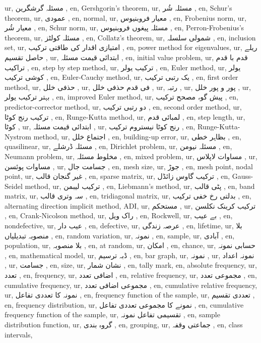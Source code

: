 ur, مسئلہ گرشگرین ,
en, Gershgorin's theorem,
ur, مسئلہ شُر ,
en, Schur's theorem,
ur, عمودی ,
en, normal,
ur, معیار فروبنیوس ,
en, Frobenius norm,
ur, معیار شُر ,
en, Schur norm,
ur, مسئلہ پیغوں فروبنیوس ,
en, Perron-Frobenius's theorem,
ur, مسئلہ کولٹز ,
en, Collatz's theorem,
ur, شمولی سلسلہ ,
en, inclusion set,
ur, امتیازی اقدار کی طاقتی ترکیب ,
en, power method for eigenvalues,
ur, ریلے حاصل تقسیم ,
ur, ابتدائی قیمت مسئلہ ,
en, initial value problem,
ur, قدم با قدم تراکیب ,
en, step by step method,
ur, ترکیب یولر ,
en, Euler method,
ur, یولر کوشی ترکیب ,
en, Euler-Cauchy method,
ur, یک رتبی ترکیب ,
en, first order method,
ur, حذفی خلل ,
ur, فی قدم حذفی خلل ,
ur, رتبہ ,
ur, پور و پور خلل ,
ur, بہتر ترکیب یولر ,
en, improved Euler method,
ur, پیش گو، مصحح ترکیب ,
en, predictor-corrector method,
ur, دو رتبی ترکیب ,
en, second order method,
ur, ترکیب رنج کوٹا ,
en, Runge-Kutta method,
ur, لمبائی قدم ,
en, step length,
ur, کوٹا ,
ur, ابتدائی قیمت مسئلہ ,
ur, رنج کوٹا نیستروم ترکیب ,
en, Runge-Kutta-Nystrom method,
ur, اجتماع خلل ,
en, building-up error,
ur, بظاہر خطی ,
en, quasilinear,
ur, مسئلہ ڈرشلے ,
en, Dirichlet problem,
ur, مسئلہ نیومن ,
en, Neumann problem,
ur, مخلوط مسئلہ ,
en, mixed problem,
ur, مساوات لاپلاس ,
ur, مساوات پوئسن ,
ur, جسامت جال ,
en, mesh size,
ur, جوڑ ,
en, mesh point, nodal point,
ur, غیر گنجان قالب ,
en, sparse matrix,
ur, ترکیب گاوس زائڈل ,
en, Gauss-Seidel method,
ur, ترکیب لیبمن ,
en, Liebmann's method,
ur, پٹی قالب ,
en, band matrix,
ur, سہ وتری قالب ,
en, tridiagonal matrix,
ur, بدلتی رخ خفی ترکیب ,
en, alternating direction implicit method, ADI,
ur, مستحکم ,
ur, ترکیب کرینک نکلسن ,
en, Crank-Nicolson method,
ur, راک ویل ,
en, Rockwell,
ur, بے عیب ,
en, nondefective,
ur, عیب دار ,
en, defective,
ur, عرصہ زندگی ,
en, lifetime,
ur, بلا منصوبہ تبدیلیاں ,
en, random variation,
ur, نمونہ ,
en, sample,
ur, آبادی ,
en, population,
ur, بلا منصوبہ ,
en, at random,
ur, امکان ,
en, chance,
ur, حسابی نمونہ ,
en, mathematical model,
ur, ڈبہ ترسیم ,
en, bar graph,
ur, نمونہ ,
ur, نمونہ اعداد ,
ur, جسامت ,
en, size,
ur, نشان شمار ,
en, tally mark,
en, absolute frequency,
ur, تعدد ,
en, frequency,
ur, اضافی تعدد ,
en, relative frequency,
ur, مجموعی تعدد ,
en, cumulative frequency,
ur, مجموعی اضافی تعدد ,
en, cumulative relative frequency,
ur, نمونہ کا تعددی تفاعل ,
en, frequency function of the sample,
ur, تعددی تقسیم ,
en, frequency distribution,
ur, نمونے کا مجموعی تعددی تفاعل ,
en, cumulative frequency function of the sample,
ur, تقسیمی تفاعل نمونہ ,
en, sample distribution function,
ur, گروہ بندی ,
en, grouping,
ur, جماعتی وقفہ ,
en, class intervals,
